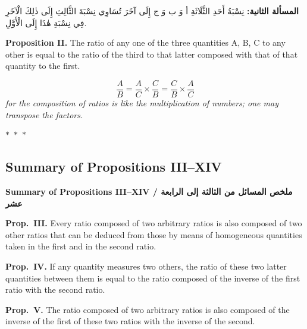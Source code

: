 \documentclass[11pt,a4paper]{article}
\theoremstyle{plain}
\theoremstyle{definition}
\theoremstyle{remark}
\newcommand{\ar}[1]{{\arabicfont\beginR #1\endR}}
\newcommand{\bilingualpair}[2]{%
  \par\noindent
  \begin{minipage}[t]{0.48\textwidth}
  #1
  \end{minipage}%
  \hfill
  \begin{minipage}[t]{0.48\textwidth}
  \vspace*{0pt}#2
  \end{minipage}\par\vspace{0.3cm}%
}
\newcommand{\ornament}{\begin{center}\textcolor{goldaccent}{$\ast$~$\ast$~$\ast$}\end{center}}
\begin{document}
\bilingualpair{\ar{\textbf{المسألة الثانية:} نِسْبَةُ أَحَدِ الثَّلَاثَةِ أ وَ ب وَ ج إِلَى آخَرَ تُسَاوِي نِسْبَةَ الثَّالِثِ إِلَى ذٰلِكَ الْآخَرِ فِي نِسْبَةِ هٰذَا إِلَى الْأَوَّلِ.}}{\noindent\textbf{Proposition II.} The ratio of any one of the three quantities A, B, C to any other is equal to the ratio of the third to that latter composed with that of that quantity to the first.}

\begin{center}
\[
\frac{A}{B} = \frac{A}{C} \times \frac{C}{B} = \frac{C}{B} \times \frac{A}{C}
\]
\textit{for the composition of ratios is like the multiplication of numbers; one may transpose the factors.}
\end{center}

\ornament

\subsection{Summary of Propositions III--XIV}
\label{sec:prop3-14}

\begin{center}
\textcolor{sectioncolor}{\textbf{Summary of Propositions III--XIV / \ar{ملخص المسائل من الثالثة إلى الرابعة عشر}}}
\end{center}

\vspace{0.3cm}

\noindent\textbf{Prop.~III.} Every ratio composed of two arbitrary ratios is also composed of two other ratios that can be deduced from those by means of homogeneous quantities taken in the first and in the second ratio.

\vspace{0.2cm}

\noindent\textbf{Prop.~IV.} If any quantity measures two others, the ratio of these two latter quantities between them is equal to the ratio composed of the inverse of the first ratio with the second ratio.

\vspace{0.2cm}

\noindent\textbf{Prop.~V.} The ratio composed of two arbitrary ratios is also composed of the inverse of the first of these two ratios with the inverse of the second.

\vspace{0.2cm}
\end{document}
